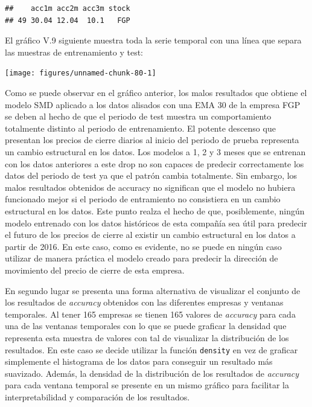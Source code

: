 \documentclass[]{DissertateUSU}
\begin{document}
\begin{verbatim}
##    acc1m acc2m acc3m stock
## 49 30.04 12.04  10.1   FGP
\end{verbatim}

\noindent El gráfico V.9 siguiente muestra toda la serie temporal con
una línea que separa las muestras de entrenamiento y test:

\begin{center}\texttt{[image: figures/unnamed-chunk-80-1]} \end{center}
\centering

\setlength\parskip{5ex}
\justifying

\noindent Como se puede observar en el gráfico anterior, los malos
resultados que obtiene el modelo SMD aplicado a los datos alisados con
una EMA 30 de la empresa FGP se deben al hecho de que el periodo de test
muestra un comportamiento totalmente distinto al periodo de
entrenamiento. El potente descenso que presentan los precios de cierre
diarios al inicio del periodo de prueba representa un cambio estructural
en los datos. Los modelos a 1, 2 y 3 meses que se entrenan con los datos
anteriores a este drop no son capaces de predecir correctamente los
datos del periodo de test ya que el patrón cambia totalmente. Sin
embargo, los malos resultados obtenidos de accuracy no significan que el
modelo no hubiera funcionado mejor si el periodo de entramiento no
consistiera en un cambio estructural en los datos. Este punto realza el
hecho de que, posiblemente, ningún modelo entrenado con los datos
históricos de esta compañía sea útil para predecir el futuro de los
precios de cierre al existir un cambio estructural en los datos a partir
de 2016. En este caso, como es evidente, no se puede en ningún caso
utilizar de manera práctica el modelo creado para predecir la dirección
de movimiento del precio de cierre de esta empresa.

\setlength\parskip{5ex}
\justifying

\noindent En segundo lugar se presenta una forma alternativa de
visualizar el conjunto de los resultados de \emph{accuracy} obtenidos
con las diferentes empresas y ventanas temporales. Al tener 165 empresas
se tienen 165 valores de \emph{accuracy} para cada una de las ventanas
temporales con lo que se puede graficar la densidad que representa esta
muestra de valores con tal de visualizar la distribución de los
resultados. En este caso se decide utilizar la función \texttt{density}
en vez de graficar simplemente el histograma de los datos para conseguir
un resultado más suavizado. Además, la densidad de la distribución de
los resultados de \emph{accuracy} para cada ventana temporal se presente
en un mismo gráfico para facilitar la interpretabilidad y comparación de
los resultados.
\end{document}

